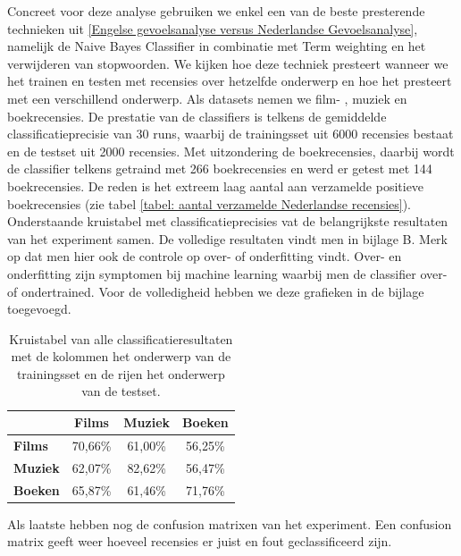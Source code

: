 Concreet voor deze analyse gebruiken we enkel een van de beste presterende technieken uit \ref{Engelse gevoelsanalyse versus Nederlandse Gevoelsanalyse}, namelijk de Naive Bayes Classifier in combinatie met Term weighting en het verwijderen van stopwoorden. We kijken hoe deze techniek presteert wanneer we het trainen en testen met recensies over hetzelfde onderwerp en hoe het presteert met een verschillend onderwerp.  Als datasets nemen we film- , muziek en boekrecensies. De prestatie van de classifiers is telkens de gemiddelde classificatieprecisie van 30 runs, waarbij de trainingsset uit 6000 recensies bestaat en de testset uit 2000 recensies. Met uitzondering de boekrecensies, daarbij wordt de classifier telkens getraind met 266 boekrecensies en werd er getest met 144 boekrecensies. De reden is het extreem laag aantal aan verzamelde positieve boekrecensies (zie tabel \ref{tabel: aantal verzamelde Nederlandse recensies}).\\


Onderstaande kruistabel met classificatieprecisies vat de belangrijkste resultaten van het experiment samen. De volledige resultaten vindt men in bijlage B. Merk op dat men hier ook de controle op over- of onderfitting vindt. Over- en onderfitting zijn symptomen bij machine learning waarbij men de classifier over- of ondertrained. Voor de volledigheid hebben we deze grafieken in de bijlage toegevoegd.    

\begin{table}[h]
\centering
\begin{tabular}{l|c|c|c|}
\cline{2-4}
                                      & \textbf{Films} & \textbf{Muziek} & \textbf{Boeken} \\ \hline
\multicolumn{1}{|l|}{\textbf{Films}} & 70,66\%         & 61,00\%         & 56,25\%         \\ \hline
\multicolumn{1}{|l|}{\textbf{Muziek}} & 62,07\%         & 82,62\%         & 56,47\%         \\ \hline
\multicolumn{1}{|l|}{\textbf{Boeken}} & 65,87\%         & 61,46\%         & 71,76\%         \\ \hline
\end{tabular}
\label{tab:alles}
\caption{Kruistabel van alle classificatieresultaten met de kolommen het onderwerp van de trainingsset en de rijen het onderwerp van de testset.} 
\end{table}

Als laatste hebben nog de confusion matrixen van het experiment. Een confusion matrix geeft weer hoeveel recensies er juist en fout geclassificeerd zijn. 

